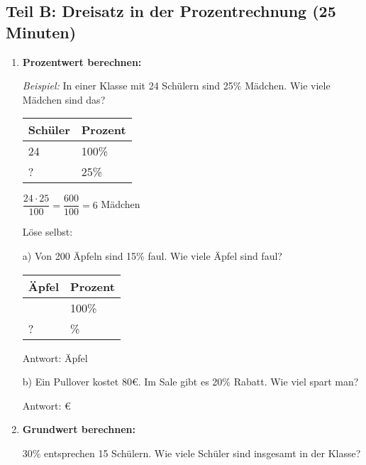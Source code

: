 \subsection*{Teil B: Dreisatz in der Prozentrechnung (25 Minuten)}

\begin{enumerate}[label=\arabic*.]
    \item \textbf{Prozentwert berechnen:}

    \textit{Beispiel:} In einer Klasse mit 24 Schülern sind 25\% Mädchen. Wie viele Mädchen sind das?

    \begin{tabular}{|l|l|}
        \hline
        Schüler & Prozent \\
        \hline
        24 & 100\% \\
        ? & 25\% \\
        \hline
    \end{tabular}

    $\dfrac{24 \cdot 25}{100} = \dfrac{600}{100} = 6$ Mädchen

    \vspace{0.5cm}

    Löse selbst:

    a) Von 200 Äpfeln sind 15\% faul. Wie viele Äpfel sind faul?

    \begin{tabular}{|l|l|}
        \hline
        Äpfel & Prozent \\
        \hline
        \phantom{000} & 100\% \\
        ? & \phantom{00}\% \\
        \hline
    \end{tabular}

    Antwort: \underline{\hspace{3cm}} Äpfel

    \vspace{0.5cm}

    b) Ein Pullover kostet 80€. Im Sale gibt es 20\% Rabatt. Wie viel spart man?

    Antwort: \underline{\hspace{3cm}} €

    \vspace{1cm}

    \item \textbf{Grundwert berechnen:}

    30\% entsprechen 15 Schülern. Wie viele Schüler sind insgesamt in der Klasse?


\end{enumerate}

